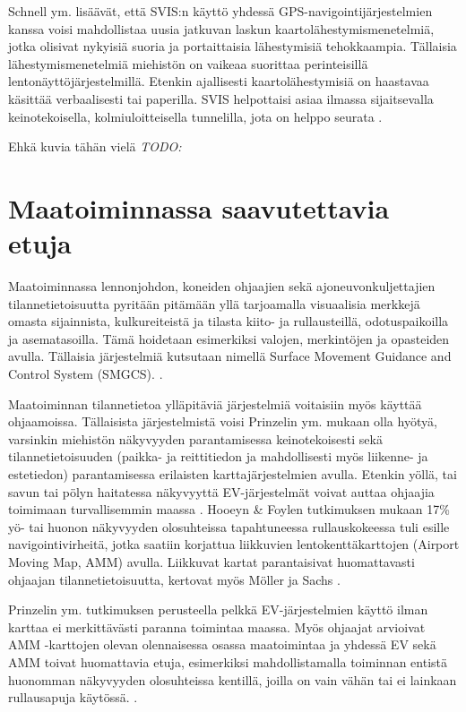\documentclass[utf8,bachelor,manualbib]{gradu3}
\begin{document}
Schnell ym. \citeyearpar{schnellym2004} lisäävät, että SVIS:n käyttö yhdessä GPS-navigointijärjestelmien kanssa voisi mahdollistaa uusia jatkuvan laskun kaartolähestymismenetelmiä, jotka olisivat nykyisiä suoria ja portaittaisia lähestymisiä tehokkaampia. Tällaisia lähestymismenetelmiä miehistön on vaikeaa suorittaa perinteisillä lentonäyttöjärjestelmillä. Etenkin ajallisesti kaartolähestymisiä on haastavaa käsittää verbaalisesti tai paperilla. SVIS helpottaisi asiaa ilmassa sijaitsevalla keinotekoisella, kolmiuloitteisella tunnelilla, jota on helppo seurata \citep{barrowspowell1999}.

Ehkä kuvia tähän vielä \citep{schnellym2004} \emph{TODO:}

\section{Maatoiminnassa saavutettavia etuja}

Maatoiminnassa lennonjohdon, koneiden ohjaajien sekä ajoneuvonkuljettajien tilannetietoisuutta pyritään pitämään yllä tarjoamalla visuaalisia merkkejä omasta sijainnista, kulkureiteistä ja tilasta kiito- ja rullausteillä, odotuspaikoilla ja asematasoilla. Tämä hoidetaan esimerkiksi valojen, merkintöjen ja opasteiden avulla. Tällaisia järjestelmiä kutsutaan nimellä Surface Movement Guidance and Control System (SMGCS). \citep{prinzel2013}.

Maatoiminnan tilannetietoa ylläpitäviä järjestelmiä voitaisiin myös käyttää ohjaamoissa. Tällaisista järjestelmistä voisi Prinzelin ym. \citeyearpar{prinzel2013} mukaan olla hyötyä, varsinkin miehistön näkyvyyden parantamisessa keinotekoisesti sekä tilannetietoisuuden (paikka- ja reittitiedon ja mahdollisesti myös liikenne- ja estetiedon) parantamisessa erilaisten karttajärjestelmien avulla. Etenkin yöllä, tai savun tai pölyn haitatessa näkyvyyttä EV-järjestelmät voivat auttaa ohjaajia toimimaan turvallisemmin maassa \citep{prinzel2013}. Hooeyn \& Foylen \citeyearpar{hooey2007} tutkimuksen mukaan 17\% yö- tai huonon näkyvyyden olosuhteissa tapahtuneessa rullauskokeessa tuli esille navigointivirheitä, jotka saatiin korjattua liikkuvien lentokenttäkarttojen (Airport Moving Map, AMM) avulla. Liikkuvat kartat parantaisivat huomattavasti ohjaajan tilannetietoisuutta, kertovat myös Möller ja Sachs \citeyearpar{mollersachs1994}.

Prinzelin ym. \citeyearpar{prinzel2013} tutkimuksen perusteella pelkkä EV-järjestelmien käyttö ilman karttaa ei merkittävästi paranna toimintaa maassa. Myös ohjaajat arvioivat AMM -karttojen olevan olennaisessa osassa maatoimintaa ja yhdessä EV sekä AMM toivat huomattavia etuja, esimerkiksi mahdollistamalla toiminnan entistä huonomman näkyvyyden olosuhteissa kentillä, joilla on vain vähän tai ei lainkaan rullausapuja käytössä. \citep{prinzel2013}.
\end{document}
